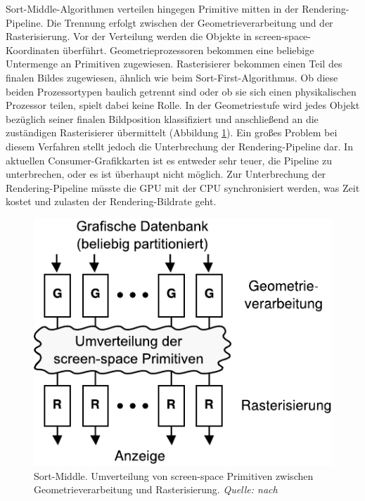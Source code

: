 Sort-Middle-Algorithmen verteilen hingegen Primitive mitten in der Rendering-Pipeline. Die Trennung erfolgt zwischen der Geometrieverarbeitung und der Rasterisierung. Vor der Verteilung werden die Objekte in screen-space-Koordinaten überführt. Geometrieprozessoren bekommen eine beliebige Untermenge an Primitiven zugewiesen. Rasterisierer bekommen einen Teil des finalen Bildes zugewiesen, ähnlich wie beim Sort-First-Algorithmus. Ob diese beiden Prozessortypen baulich getrennt sind oder ob sie sich einen physikalischen Prozessor teilen, spielt dabei keine Rolle. In der Geometriestufe wird jedes Objekt bezüglich seiner finalen Bildposition klassifiziert und anschließend an die zuständigen Rasterisierer übermittelt (Abbildung \ref{fig:relwork:sortmiddle}). Ein großes Problem bei diesem Verfahren stellt jedoch die Unterbrechung der Rendering-Pipeline dar. In aktuellen Consumer-Grafikkarten ist es entweder sehr teuer, die Pipeline zu unterbrechen, oder es ist überhaupt nicht möglich. Zur Unterbrechung der Rendering-Pipeline müsste die GPU mit der CPU synchronisiert werden, was Zeit kostet und zulasten der Rendering-Bildrate geht.
\begin{figure}
 \centering
  \includegraphics[scale=0.8]{images/sort-middle.pdf}
  \caption{Sort-Middle. Umverteilung von screen-space Primitiven zwischen Geometrieverarbeitung und Rasterisierung. \textit{Quelle: nach \cite{molnar}}}
 \label{fig:relwork:sortmiddle}
\end{figure}

